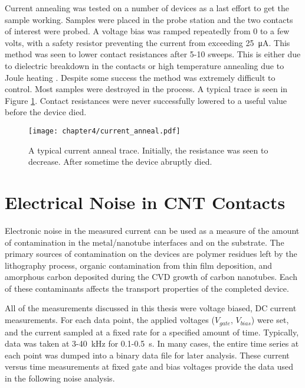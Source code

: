 Current annealing was tested on a number of devices as a last effort to get the sample working. Samples were placed in the probe station and the two contacts of interest were probed. A voltage bias was ramped repeatedly from 0 to a few volts, with a safety resistor preventing the current from exceeding \SI{25}{\micro\ampere}. This method was seen to lower contact resistances after 5-10 sweeps. This is either due to dielectric breakdown in the contacts or high temperature annealing due to Joule heating \cite{Maki2004, Woo2007, Dong2007}. Despite some success the method was extremely difficult to control. Most samples were destroyed in the process. A typical trace is seen in Figure \ref{fig:current_anneal}. Contact resistances were never successfully lowered to a useful value before the device died.

\begin{figure}
    \centering
    \texttt{[image: chapter4/current\_anneal.pdf]}
    \caption{A typical current anneal trace. Initially, the resistance was seen to decrease. After sometime the device abruptly died.}
    \label{fig:current_anneal}
\end{figure}
    
\section{Electrical Noise in CNT Contacts}

Electronic noise in the measured current can be used as a measure of the amount of contamination in the metal/nanotube interfaces and on the substrate. The primary sources of contamination on the devices are polymer residues left by the lithography process, organic contamination from thin film deposition, and amorphous carbon deposited during the CVD growth of carbon nanotubes. Each of these contaminants affects the transport properties of the completed device. 

All of the measurements discussed in this thesis were voltage biased, DC current measurements. For each data point, the applied voltages ($V_{gate}$, $V_{bias}$) were set, and the current sampled at a fixed rate for a specified amount of time. Typically, data was taken at 3-\SI{40}{\kilo\hertz} for 0.1-\SI{0.5}{\second}. In many cases, the entire time series at each point was dumped into a binary data file for later analysis. These current versus time measurements at fixed gate and bias voltages provide the data used in the following noise analysis.


